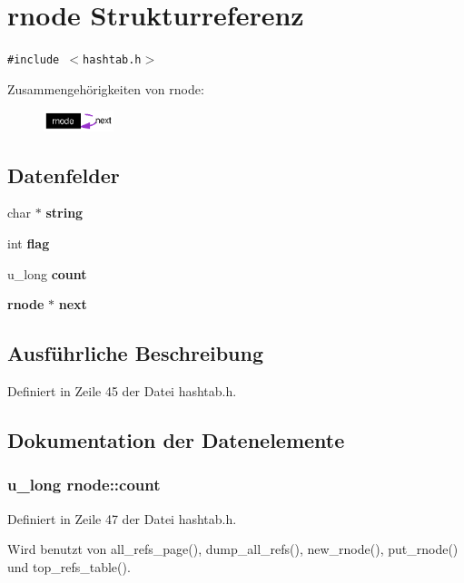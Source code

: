 \section{rnode Strukturreferenz}
\label{structrnode}
{\tt \#include $<$hashtab.h$>$}

Zusammengeh\"{o}rigkeiten von rnode:\begin{figure}[H]
\begin{center}
\leavevmode
\includegraphics[width=58pt]{structrnode__coll__graph}
\end{center}
\end{figure}
\subsection*{Datenfelder}
\begin{CompactItemize}
\item 
char $\ast$ {\bf string}
\item 
int {\bf flag}
\item 
u\_\-long {\bf count}
\item 
{\bf rnode} $\ast$ {\bf next}
\end{CompactItemize}


\subsection{Ausf\"{u}hrliche Beschreibung}




Definiert in Zeile 45 der Datei hashtab.h.

\subsection{Dokumentation der Datenelemente}
\subsubsection{\setlength{\rightskip}{0pt plus 5cm}u\_\-long {\bf rnode::count}}\label{structrnode_4034f46036f5fa702a86b3609d7a557a}




Definiert in Zeile 47 der Datei hashtab.h.

Wird benutzt von all\_\-refs\_\-page(), dump\_\-all\_\-refs(), new\_\-rnode(), put\_\-rnode() und top\_\-refs\_\-table().
